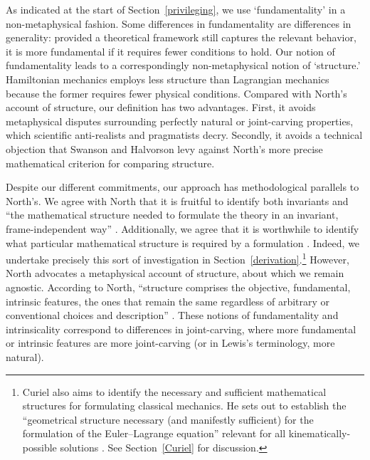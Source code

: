 \documentclass[12pt, english, twoside]{article} %
\begin{document}
As indicated at the start of Section~\ref{privileging}, we use `fundamentality' in a non-metaphysical fashion. Some differences in fundamentality are differences in generality: provided a theoretical framework still captures the relevant behavior, it is more fundamental if it requires fewer conditions to hold. Our notion of fundamentality leads to a correspondingly non-metaphysical notion of `structure.' Hamiltonian mechanics employs less structure than Lagrangian mechanics because the former requires fewer physical conditions. Compared with North's \parencites*[]{North} account of structure, our definition has two advantages. First, it avoids metaphysical disputes surrounding perfectly natural or joint-carving properties, which scientific anti-realists and pragmatists decry. Secondly, it avoids a technical objection that Swanson and Halvorson \parencites*[]{Swanson} levy against North's more precise mathematical criterion for comparing structure. 

Despite our different commitments, our approach has methodological parallels to North's. We agree with North that it is fruitful to identify both invariants and ``the mathematical structure needed to formulate the theory in an invariant, frame-independent way'' \parencites*[65]{North}. Additionally, we agree that it is worthwhile to identify what particular mathematical structure is required by a formulation \parencites[78]{North}. Indeed, we undertake precisely this sort of investigation in Section~\ref{derivation}.\footnote{Curiel also aims to identify the necessary and sufficient mathematical structures for formulating classical mechanics. He sets out to establish the ``geometrical structure necessary (and manifestly sufficient) for the formulation of the Euler--Lagrange equation'' relevant for all kinematically-possible solutions \parencites*[292]{Curiel}. See Section~\ref{Curiel} for discussion.} However, North advocates a metaphysical account of structure, about which we remain agnostic. According to North, ``structure comprises the objective, fundamental, intrinsic features, the ones that remain the same regardless of arbitrary or conventional choices and description'' \parencites*[66]{North}. These notions of fundamentality and intrinsicality correspond to differences in joint-carving, where more fundamental or intrinsic features are more joint-carving (or in Lewis's \parencites*[]{Lewis1983} terminology, more natural). 
\end{document}
